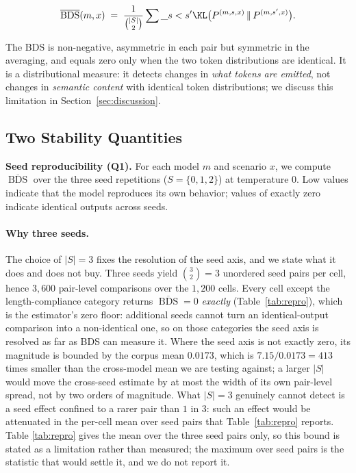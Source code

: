 \documentclass[11pt]{article}
\DeclareMathOperator{\BDS}{BDS}
\begin{document}
\begin{equation}
  \overline{\BDS}(m, x) \;=\; \frac{1}{\binom{|S|}{2}} \sum\_{s < s'}
  \KL\bigl(P^{(m,s,x)} \,\|\, P^{(m,s',x)}\bigr).
\end{equation}

The BDS is non-negative, asymmetric in each pair but symmetric in the
averaging, and equals zero only when the two token distributions are
identical. It is a distributional measure: it detects changes in \emph{what
tokens are emitted}, not changes in \emph{semantic content} with identical
token distributions; we discuss this limitation in
Section~\ref{sec:discussion}.

\subsection{Two Stability Quantities}

\textbf{Seed reproducibility (Q1).} For each model $m$ and scenario $x$, we
compute $\overline{\BDS}$ over the three seed repetitions
($S = \{0,1,2\}$) at temperature 0. Low values indicate that the model
reproduces its own behavior; values of exactly zero indicate identical
outputs across seeds.

\paragraph{Why three seeds.} The choice of $|S| = 3$ fixes the resolution of
the seed axis, and we state what it does and does not buy. Three seeds yield
$\binom{3}{2} = 3$ unordered seed pairs per cell, hence $3{,}600$ pair-level
comparisons over the $1{,}200$ cells. Every cell except the length-compliance
category returns $\overline{\BDS} = 0$ \emph{exactly} (Table~\ref{tab:repro}),
which is the estimator's zero floor: additional seeds cannot turn an
identical-output comparison into a non-identical one, so on those categories
the seed axis is resolved as far as BDS can measure it. Where the seed axis is
not exactly zero, its magnitude is bounded by the corpus mean
$0.0173$, which is $7.15 / 0.0173 = 413$ times smaller than the cross-model
mean we are testing against; a larger $|S|$ would move the cross-seed estimate
by at most the width of its own pair-level spread, not by two orders of
magnitude. What $|S| = 3$ genuinely cannot detect is a seed effect confined to
a rarer pair than $1$ in $3$: such an effect would be attenuated in the
per-cell mean over seed pairs that Table~\ref{tab:repro} reports. Table
\ref{tab:repro} gives the mean over the three seed pairs only, so this bound is
stated as a limitation rather than measured; the maximum over seed pairs is the
statistic that would settle it, and we do not report it.
\end{document}
